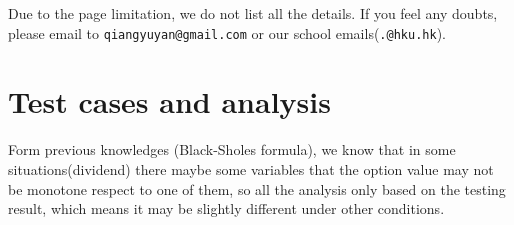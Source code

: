 \documentclass[11pt,a4paper]{article}
\begin{document}
    Due to the page limitation, we do not list all the details.
    If you feel any doubts, please email to
    \texttt{qiangyuyan@gmail.com} or 
    our school emails(\texttt{.@hku.hk}).
    


    \section{Test cases and analysis} 

    Form previous knowledges (Black-Sholes formula), 
    we know that in some situations(dividend)
    there maybe some variables that
    the option value may not be monotone
    respect to one of them, 
    so all the analysis only based on the testing
    result, which means it may be slightly different
    under other conditions.
    
\end{document}
